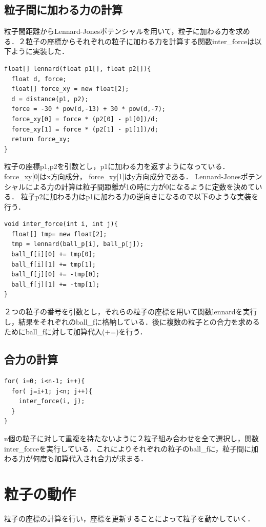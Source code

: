 \subsection{粒子間に加わる力の計算}
粒子間距離からLennard-Jonesポテンシャルを用いて，粒子に加わる力を求める．２粒子の座標からそれぞれの粒子に加わる力を計算する関数inter\_forceは以下ように実装した．
\begin{screen}
{\small
\begin{verbatim}
float[] lennard(float p1[], float p2[]){
  float d, force;
  float[] force_xy = new float[2];
  d = distance(p1, p2);
  force = -30 * pow(d,-13) + 30 * pow(d,-7);
  force_xy[0] = force * (p2[0] - p1[0])/d; 
  force_xy[1] = force * (p2[1] - p1[1])/d;
  return force_xy;  
}
\end{verbatim}}
\end{screen}
粒子の座標p1,p2を引数とし，p1に加わる力を返すようになっている．force\_xy[0]はx方向成分， force\_xy[1]はy方向成分である．
Lennard-Jonesポテンシャルによる力の計算は粒子間距離が1の時に力が0になるように定数を決めている．
粒子p2に加わる力はp1に加わる力の逆向きになるので以下のような実装を行う．
\begin{screen}
{\small
\begin{verbatim}
void inter_force(int i, int j){
  float[] tmp= new float[2];
  tmp = lennard(ball_p[i], ball_p[j]);
  ball_f[i][0] += tmp[0];
  ball_f[i][1] += tmp[1];
  ball_f[j][0] += -tmp[0];
  ball_f[j][1] += -tmp[1];
}
\end{verbatim}}
\end{screen}
２つの粒子の番号を引数とし，それらの粒子の座標を用いて関数lennardを実行し，結果をそれぞれのball\_fに格納している．後に複数の粒子との合力を求めるためにball\_fに対して加算代入(+=)を行う．
\subsection{合力の計算}
\begin{screen}
{\small
\begin{verbatim}
for( i=0; i<n-1; i++){
  for( j=i+1; j<n; j++){
    inter_force(i, j);
  }
}
\end{verbatim}}
\end{screen}
n個の粒子に対して重複を持たないように２粒子組み合わせを全て選択し，関数inter\_forceを実行している．これによりそれぞれの粒子のball\_fに，粒子間に加わる力が何度も加算代入され合力が求まる．

\section{粒子の動作}
粒子の座標の計算を行い，座標を更新することによって粒子を動かしていく．
